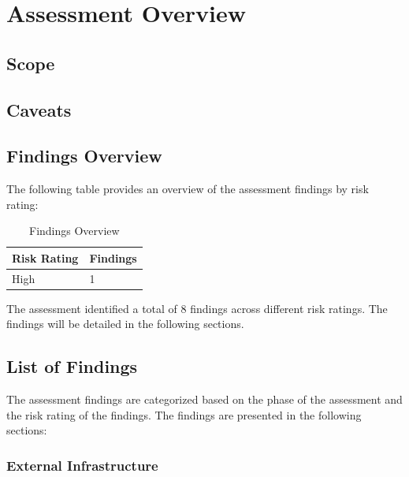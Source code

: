 \documentclass[11pt]{article}
\begin{document}
\pagebreak

\section{Assessment Overview}

\subsection{Scope}

\lipsum[66]

\lipsum[67]

\subsection{Caveats}

\lipsum[68][2]

\lipsum[68][2]

\lipsum[69][1]

\subsection{Findings Overview}

The following table provides an overview of the assessment findings by risk rating:

\begin{table}[h]
\centering
\begin{tabular}{|l|l|}
\hline
\textbf{Risk Rating} & \textbf{Findings} \\ \hline
High & 1 \\ \hline
\end{tabular}
\caption{Findings Overview}
\end{table}

The assessment identified a total of 8 findings across different risk ratings. The findings will be detailed in the following sections.

\newpage

\subsection{List of Findings}

The assessment findings are categorized based on the phase of the assessment and the risk rating of the findings. The findings are presented in the following sections:

\subsubsection{External Infrastructure}
\end{document}
